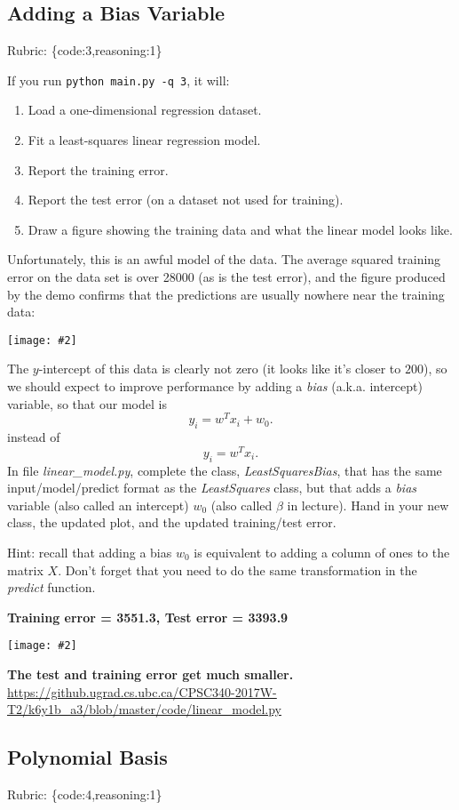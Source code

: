 \documentclass{article}
\def\rubric#1{\gre{Rubric: \{#1\}}}{}
\def\blu#1{{\color{blu}#1}}
\def\gre#1{{\color{gre}#1}}
\newcommand{\centerfig}[2]{\begin{center}\texttt{[image: \#2]}\end{center}}
\def\enum#1{\begin{enumerate}#1\end{enumerate}}
\begin{document}
\subsection{Adding a Bias Variable}
\rubric{code:3,reasoning:1}

If you run  \verb|python main.py -q 3|, it will:
\enum{
\item Load a one-dimensional regression dataset.
\item Fit a least-squares linear regression model.
\item Report the training error.
\item Report the test error (on a dataset not used for training).
\item Draw a figure showing the training data and what the linear model looks like.
}
Unfortunately, this is an awful model of the data. The average squared training error on the data set is over 28000
(as is the test error), and the figure produced by the demo confirms that the predictions are usually nowhere near
 the training data:
\centerfig{.5}{../figs/least_squares_no_bias.pdf}
The $y$-intercept of this data is clearly not zero (it looks like it's closer to $200$),
so we should expect to improve performance by adding a \emph{bias} (a.k.a. intercept) variable, so that our model is
\[
y_i = w^Tx_i + w_0.
\]
instead of
\[
y_i = w^Tx_i.
\]
\blu{In file \emph{linear\_model.py}, complete the class, \emph{LeastSquaresBias}, 
that has the same input/model/predict format as the \emph{LeastSquares} class, 
but that adds a \emph{bias} variable (also called an intercept) $w_0$ (also called $\beta$ in lecture). Hand in your new class, the updated plot, 
and the updated training/test error.}

Hint: recall that adding a bias $w_0$ is equivalent to adding a column of ones to the matrix $X$. Don't forget that you need to do the same transformation in the \emph{predict} function.

\textbf{Training error = 3551.3, 	
Test error     = 3393.9}
\centerfig{.5}{../figs/least_squares_bias.pdf}
\textbf{The test and training error get much smaller.}\\
\url{https://github.ugrad.cs.ubc.ca/CPSC340-2017W-T2/k6y1b_a3/blob/master/code/linear_model.py}
\subsection{Polynomial Basis}
\rubric{code:4,reasoning:1}
\end{document}
